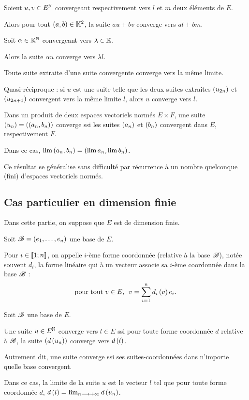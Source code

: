 \begin{theo}
Soient \(u,v\in E^{\mathbb{N}}\) convergeant respectivement vers \(l\) et \(m\) deux éléments de \(E\).

Alors pour tout \(\left(a,b\right)\in\mathbb{K}^2\), la suite \(au+bv\) converge vers \(al+bm\).

Soit \(\alpha\in\mathbb{K}^{\mathbb{N}}\) convergeant vers \(\lambda\in\mathbb{K}\).

Alors la suite \(\alpha u\) converge vers \(\lambda l\).
\end{theo}

\begin{prop}
Toute suite extraite d'une suite convergente converge vers la même limite.

Quasi-réciproque : si \(u\) est une suite telle que les deux suites extraites \(\left(u_{2n}\right)\) et \(\left(u_{2n+1}\right)\) convergent vers la même limite \(l\), alors \(u\) converge vers \(l\).
\end{prop}

\begin{prop}
Dans un produit de deux espaces vectoriels normés \(E\times F\), une suite \(\left(u_n\right)=\left(\left(a_n,b_n\right)\right)\) converge ssi les suites \(\left(a_n\right)\) et \(\left(b_n\right)\) convergent dans \(E\), respectivement \(F\).

Dans ce cas, \(\lim\left(a_n,b_n\right)=\left(\lim a_n,\lim b_n\right)\).

Ce résultat se généralise sans difficulté par récurrence à un nombre quelconque (fini) d'espaces vectoriels normés.
\end{prop}

\subsection{Cas particulier en dimension finie}

Dans cette partie, on suppose que \(E\) est de dimension finie.

\begin{defi}
Soit \(\mathscr{B}=\left(e_1,\dots,e_n\right)\) une base de \(E\).

Pour \(i\in\left\llbracket1;n\right\rrbracket\), on appelle \(i\)-ème forme coordonnée (relative à la base \(\mathscr{B}\)), notée souvent \(d_i\), la forme linéaire qui à un vecteur associe sa \(i\)-ème coordonnée dans la base \(\mathscr{B}\) : \[\quantifs{\tpt v\in E}v=\sum_{i=1}^nd_i\paren{v}e_i.\]
\end{defi}

\begin{theo}
Soit \(\mathscr{B}\) une base de \(E\).

Une suite \(u\in E^{\mathbb{N}}\) converge vers \(l\in E\) ssi pour toute forme coordonnée \(d\) relative à \(\mathscr{B}\), la suite \(\left(d\left(u_n\right)\right)\) converge vers \(d\left(l\right)\).

Autrement dit, une suite converge ssi ses suites-coordonnées dans n'importe quelle base convergent.

Dans ce cas, la limite de la suite \(u\) est le vecteur \(l\) tel que pour toute forme coordonnée \(d\), \(d\left(l\right)=\lim_{n\longrightarrow+\infty}d\left(u_n\right)\).
\end{theo}

